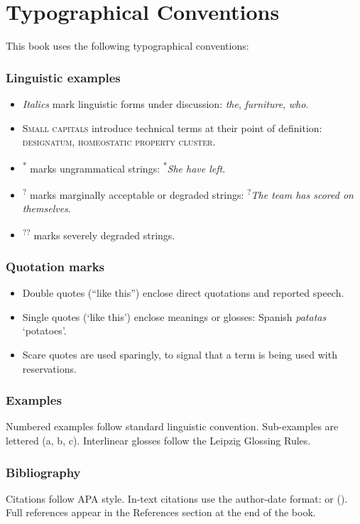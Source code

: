 \chapter*{Typographical Conventions}

This book uses the following typographical conventions:

\subsection*{Linguistic examples}

\begin{itemize}[nosep]
\item \textit{Italics} mark linguistic forms under discussion: \textit{the}, \textit{furniture}, \textit{who}.
\item \textsc{Small capitals} introduce technical terms at their point of definition: \textsc{designatum}, \textsc{homeostatic property cluster}.
\item \textsuperscript{*} marks ungrammatical strings: \textsuperscript{*}\textit{She have left}.
\item \textsuperscript{?} marks marginally acceptable or degraded strings: \textsuperscript{?}\textit{The team has scored on themselves}.
\item \textsuperscript{??} marks severely degraded strings.
\end{itemize}

\subsection*{Quotation marks}

\begin{itemize}[nosep]
\item Double quotes (\enquote{like this}) enclose direct quotations and reported speech.
\item Single quotes (`like this') enclose meanings or glosses: Spanish \textit{patatas} `potatoes'.
\item Scare quotes are used sparingly, to signal that a term is being used with reservations.
\end{itemize}

\subsection*{Examples}

Numbered examples follow standard linguistic convention. Sub-examples are lettered (a, b, c). Interlinear glosses follow the Leipzig Glossing Rules.

\subsection*{Bibliography}

Citations follow APA style. In-text citations use the author-date format: \textcite{huddleston2002} or (\cite{huddleston2002}). Full references appear in the References section at the end of the book.
